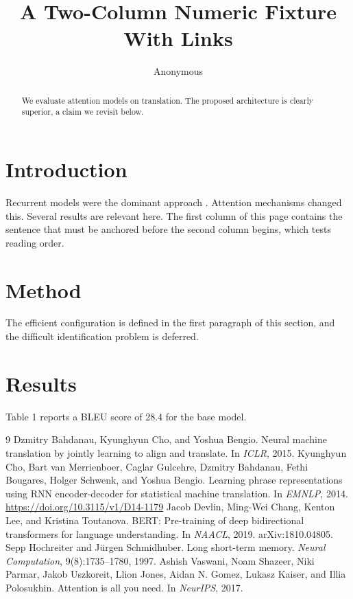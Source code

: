 \documentclass[10pt,twocolumn]{article}
\title{A Two-Column Numeric Fixture With Links}
\author{Anonymous}
\date{}
\begin{document}
\maketitle
\begin{abstract}
We evaluate attention models on translation. The proposed architecture is clearly superior, a claim we revisit below.
\end{abstract}
\section{Introduction}
Recurrent models \cite{hochreiter1997} were the dominant approach \cite{cho2014,bahdanau2015}. Attention mechanisms \cite{bahdanau2015,vaswani2017,devlin2019} changed this. Several results \cite{hochreiter1997,cho2014,bahdanau2015,vaswani2017} are relevant here. The first column of this page contains the sentence that must be anchored before the second column begins, which tests reading order.
\lipsum[1-3]
\section{Method}
The efficient configuration is defined in the first paragraph of this section, and the difficult identification problem is deferred. \lipsum[4-6]
\section{Results}
Table 1 reports a BLEU score of 28.4 for the base model. \lipsum[7-8]
\begin{thebibliography}{9}
 Dzmitry Bahdanau, Kyunghyun Cho, and Yoshua Bengio. Neural machine translation by jointly learning to align and translate. In \emph{ICLR}, 2015.
 Kyunghyun Cho, Bart van Merrienboer, Caglar Gulcehre, Dzmitry Bahdanau, Fethi Bougares, Holger Schwenk, and Yoshua Bengio. Learning phrase representations using RNN encoder-decoder for statistical machine translation. In \emph{EMNLP}, 2014. \url{https://doi.org/10.3115/v1/D14-1179}
 Jacob Devlin, Ming-Wei Chang, Kenton Lee, and Kristina Toutanova. BERT: Pre-training of deep bidirectional transformers for language understanding. In \emph{NAACL}, 2019. arXiv:1810.04805.
 Sepp Hochreiter and J\"urgen Schmidhuber. Long short-term memory. \emph{Neural Computation}, 9(8):1735--1780, 1997.
 Ashish Vaswani, Noam Shazeer, Niki Parmar, Jakob Uszkoreit, Llion Jones, Aidan N. Gomez, Lukasz Kaiser, and Illia Polosukhin. Attention is all you need. In \emph{NeurIPS}, 2017.
\end{thebibliography}
\end{document}
